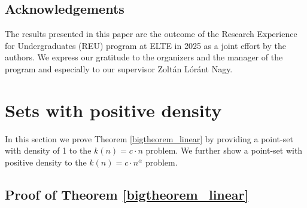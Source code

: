 \documentclass[11pt,a4paper]{article}
\numberwithin{equation}{section}
\begin{document}
\subsection*{Acknowledgements}

The results presented in this paper are the outcome of the Research Experience for Undergraduates (REU) program at ELTE in 2025 as a joint effort by the authors. We express our gratitude to the organizers and the manager of the program and especially to our supervisor Zoltán Lóránt Nagy.

\newpage
\section{Sets with positive density}\label{positive_density_sets}

In this section we prove Theorem \ref{bigtheorem_linear} by providing a point-set with density of 1 to the $k(n) = c\cdot n$ problem. We further show a point-set with positive density to the $k(n) = c\cdot n^\alpha$ problem. 
\medskip

\subsection{Proof of Theorem \ref{bigtheorem_linear}}
\end{document}
